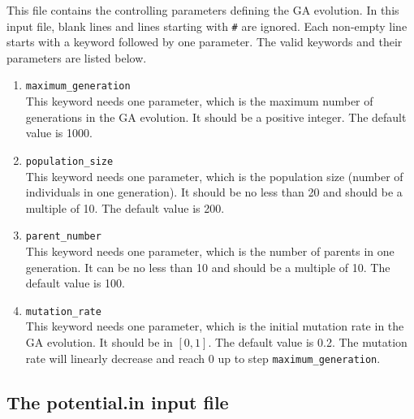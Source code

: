\documentclass[12pt,a4paper]{report}
\begin{document}
This file contains the controlling parameters defining the GA evolution. In this input file, blank lines and lines starting with \verb"#" are ignored. Each non-empty line starts with a keyword followed by one parameter.  The valid keywords and their parameters are listed below.
\begin{enumerate}
\item  \verb"maximum_generation"\\
This keyword needs one parameter, which is the maximum number of generations in the GA evolution. It should be a positive integer. The default value is 1000.
\item  \verb"population_size" \\
This keyword needs one parameter, which is the population size (number of individuals in one generation). It should be no less than 20 and should be a multiple of 10. The default value is 200.
\item  \verb"parent_number"\\
This keyword needs one parameter, which is the number of parents in one generation. It can be no less than 10 and should be a multiple of 10. The default value is 100.
\item  \verb"mutation_rate"\\
This keyword needs one parameter, which is the initial mutation rate in the GA evolution. It should be in $[0,1]$. The default value is 0.2. The mutation rate will linearly decrease and reach 0 up to step \verb"maximum_generation".
\end{enumerate}

\subsection{The potential.in input file}
\end{document}

